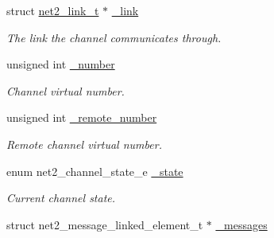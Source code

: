 \begin{DoxyCompactItemize}
\item 
\hypertarget{structnet2__channel__output__t_a8e678b9a5931b8d9d05e29e59cc0fa29}{}struct \hyperlink{structnet2__link__t}{net2\+\_\+link\+\_\+t} $\ast$ \hyperlink{structnet2__channel__output__t_a8e678b9a5931b8d9d05e29e59cc0fa29}{\+\_\+link}\label{structnet2__channel__output__t_a8e678b9a5931b8d9d05e29e59cc0fa29}

\begin{DoxyCompactList}\small\item\em The link the channel communicates through. \end{DoxyCompactList}\item 
\hypertarget{structnet2__channel__output__t_ad271c6722053d44e59fe7e1c50dda193}{}unsigned int \hyperlink{structnet2__channel__output__t_ad271c6722053d44e59fe7e1c50dda193}{\+\_\+number}\label{structnet2__channel__output__t_ad271c6722053d44e59fe7e1c50dda193}

\begin{DoxyCompactList}\small\item\em Channel virtual number. \end{DoxyCompactList}\item 
\hypertarget{structnet2__channel__output__t_af4e5410aaceaef8e8bb17d44b1a28a67}{}unsigned int \hyperlink{structnet2__channel__output__t_af4e5410aaceaef8e8bb17d44b1a28a67}{\+\_\+remote\+\_\+number}\label{structnet2__channel__output__t_af4e5410aaceaef8e8bb17d44b1a28a67}

\begin{DoxyCompactList}\small\item\em Remote channel virtual number. \end{DoxyCompactList}\item 
\hypertarget{structnet2__channel__output__t_a924791491eaed2c9f34f89ebe943abfd}{}enum net2\+\_\+channel\+\_\+state\+\_\+e \hyperlink{structnet2__channel__output__t_a924791491eaed2c9f34f89ebe943abfd}{\+\_\+state}\label{structnet2__channel__output__t_a924791491eaed2c9f34f89ebe943abfd}

\begin{DoxyCompactList}\small\item\em Current channel state. \end{DoxyCompactList}\item 
\hypertarget{structnet2__channel__output__t_a297f9515cb73f62847b127a55ad63a09}{}struct net2\+\_\+message\+\_\+linked\+\_\+element\+\_\+t $\ast$ \hyperlink{structnet2__channel__output__t_a297f9515cb73f62847b127a55ad63a09}{\+\_\+messages}\label{structnet2__channel__output__t_a297f9515cb73f62847b127a55ad63a09}


\end{DoxyCompactItemize}
